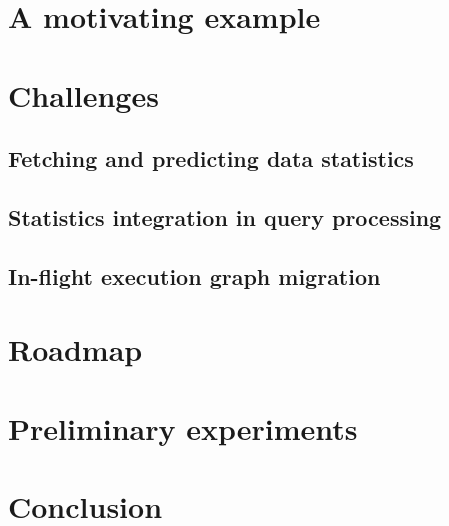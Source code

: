 \documentclass[sigconf]{acmart}
\theoremstyle{remark}
\begin{document}
\section {A motivating example}

\section {Challenges}

\subsection{Fetching and predicting data statistics}

\subsection{Statistics integration in query processing}

\subsection{In-flight execution graph migration}

\section {Roadmap}

\section {Preliminary experiments}

\section {Conclusion}



\end{document}
